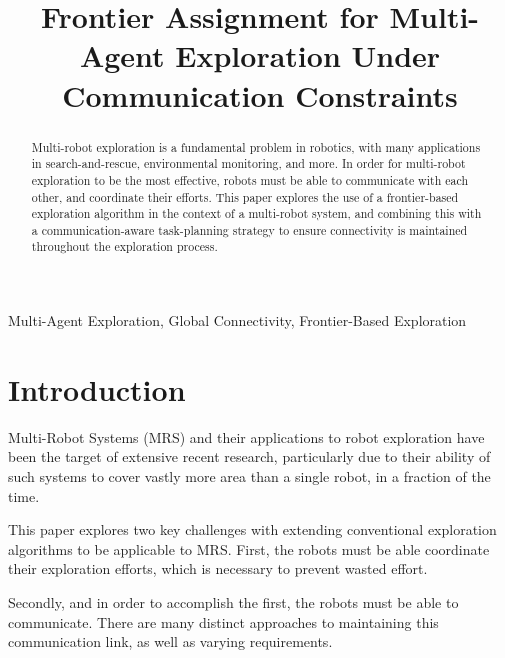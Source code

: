 \documentclass[conference]{IEEEtran}
\begin{document}
\title{Frontier Assignment for Multi-Agent Exploration Under Communication Constraints}

\author{
}

\maketitle

\begin{abstract}
    Multi-robot exploration is a fundamental problem in robotics, with many applications in search-and-rescue, environmental monitoring, and more.
    In order for multi-robot exploration to be the most effective, robots must be able to communicate with each other, and coordinate their efforts.
    This paper explores the use of a frontier-based exploration algorithm in the context of a multi-robot system, and combining this with a 
    communication-aware task-planning strategy to ensure connectivity is maintained throughout the exploration process.
\end{abstract}

\begin{IEEEkeywords}
Multi-Agent Exploration, Global Connectivity, Frontier-Based Exploration
\end{IEEEkeywords}

\section{Introduction}
Multi-Robot Systems (MRS) and their applications to robot exploration have been the target of extensive recent research, 
particularly due to their ability of such systems to cover vastly more area than a single robot, in a fraction of the time.

This paper explores two key challenges with extending conventional exploration algorithms to be applicable to MRS.
First, the robots must be able coordinate their exploration efforts, which is necessary to prevent wasted effort. 

Secondly, and in order to accomplish the first, the robots must be able to communicate. 
There are many distinct approaches to maintaining this communication link, as well as varying requirements.
\end{document}
